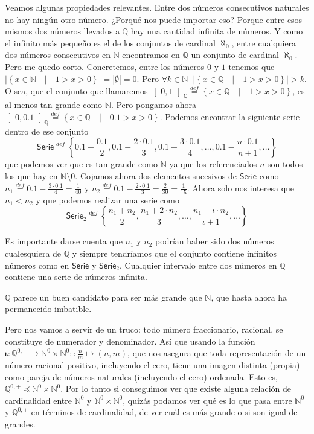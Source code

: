 \documentclass{amsart}
\theoremstyle{definition}
\theoremstyle{remark}
\numberwithin{equation}{section}
\newcommand{\abs}[1]{\left\lvert#1\right\rvert}
\newcommand{\set}[1]{\left\lbrace{#1}\right\rbrace}
\newcommand{\setprop}[2]{\left\lbrace{ #1 }\quad|\quad{ #2 }\right\rbrace}
\newcommand{\setN}{\mathds N}
\newcommand{\setQ}{\mathds Q}
\newcommand{\fromto}{\longrightarrow}
\newcommand{\card}[1]{\abs{#1}}
\newcommand{\monrel}[1]{\mathbf{#1}}
\newcommand{\funct}[1]{\monrel{#1}}
\newcommand{\defin}{\overset {def}{=}}
\newcommand{\leqpot}{\preccurlyeq}
\begin{document}
	Veamos algunas propiedades relevantes. Entre dos números consecutivos 
naturales no hay ningún otro número. ¿Porqué nos puede importar eso? Porque 
entre esos mismos dos números llevados a $\setQ$ hay una cantidad infinita de 
números. Y como el infinito más pequeño es el de los conjuntos de cardinal 
$\aleph_0$, entre cualquiera dos números consecutivos en $\setN$ encontramos 
en $\setQ$ un conjunto de cardinal $\aleph_0$. Pero me quedo corto. 
Concretemos, entre los números $0$ y $1$ tenemos que 
$\card{\setprop{x\in\setN}{1 > x > 0}}=\card{\emptyset}=0$. Pero $\forall k 
\in \setN \;\; \card{\setprop{x\in\setQ}{1 > x > 0}} > k$. O sea, que el 
conjunto que llamaremos ${\left]0,1\right[}_{\setQ} \defin 
\setprop{x\in\setQ}{1 > x > 0}$, es al menos tan grande como $\setN$. Pero 
pongamos ahora ${\left]0,0.1\right[}_{\setQ} \defin \setprop{x\in\setQ}{0.1 > 
x > 0}$. Podemos encontrar la siguiente serie dentro de ese conjunto 
$$\textsf{Serie}\defin\set{0.1-\frac{0.1}{2},0.1-\frac{2\cdot 
0.1}{3},0.1-\frac{3\cdot 0.1}{4},\ldots, 0.1-\frac{n\cdot 0.1}{n+1},\ldots}$$ 
que podemos ver que es tan grande como $\setN$ ya que los referenciados $n$ 
son todos los que hay en $\setN\setminus{0}$. Cojamos ahora dos elementos 
sucesivos de $\textsf{Serie}$ como $n_1 \defin 0.1-\frac{3\cdot 0.1}{4} = 
\frac{1}{40}$ y $n_2 \defin 0.1-\frac{2\cdot 0.1}{3} = \frac{2}{30} =  
\frac{1}{15}$. Ahora solo nos interesa que $n_1 < n_2$ y que podemos realizar 
una serie como $$\textsf{Serie}_2 \defin \set{\frac{n_1 + n_2}{2}, \frac{n_1 
+ 2 \cdot n_2}{3},\ldots,\frac{n_1 + \iota \cdot n_2}{\iota+1},\ldots}$$


	Es importante darse cuenta que $n_1$ y $n_2$ podrían haber sido dos 
números cualesquiera de $\setQ$ y siempre tendríamos que el conjunto contiene 
infinitos números como en $\textsf{Serie}$ y $\textsf{Serie}_2$. Cualquier 
intervalo entre dos números en $\setQ$ contiene una serie de números 
infinita.


	$\setQ$ parece un buen candidato para ser más grande que $\setN$, que 
hasta ahora ha permanecido imbatible.


\newcommand{\ordpair}[2]{\left({{#1},{#2}}\right)}


	Pero nos vamos a servir de un truco: todo número fraccionario, racional, 
se constituye de numerador y denominador. Así que usando la función $ 
\funct{\iota}: \setQ^{0,+} \fromto \setN^{0}\times\setN^{0} :: \frac{n}{m} 
\mapsto \ordpair{n}{m}$, que nos asegura que toda representación de un número 
racional positivo, incluyendo el cero, tiene una imagen distinta (propia) 
como pareja de números naturales (incluyendo el cero) ordenada. Esto es, 
$\setQ^{0,+} \leqpot \setN^{0}\times\setN^{0}$. Por lo tanto si conseguimos 
ver que existe alguna relación de cardinalidad entre $\setN^{0}$ y 
$\setN^{0}\times\setN^{0}$, quizás podamos ver qué es lo que pasa entre 
$\setN^{0}$ y $\setQ^{0,+}$ en términos de cardinalidad, de ver cuál es más
grande o si son igual de grandes.
\end{document}

